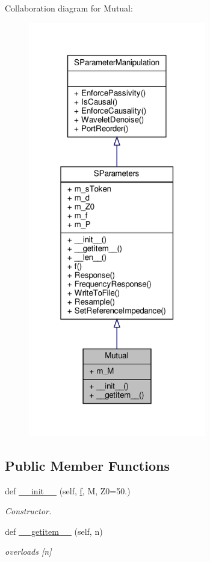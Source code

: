 Collaboration diagram for Mutual\+:\nopagebreak
\begin{figure}[H]
\begin{center}
\leavevmode
\includegraphics[width=220pt]{classSignalIntegrity_1_1SParameters_1_1Devices_1_1Mutual_1_1Mutual__coll__graph}
\end{center}
\end{figure}
\subsection*{Public Member Functions}
\begin{DoxyCompactItemize}
\item 
def \hyperlink{classSignalIntegrity_1_1SParameters_1_1Devices_1_1Mutual_1_1Mutual_a0b54ec80fdef206b3b2bf17d77b083ee}{\+\_\+\+\_\+init\+\_\+\+\_\+} (self, \hyperlink{classSignalIntegrity_1_1SParameters_1_1SParameters_1_1SParameters_a32e7a34d6837fe949b413c852a0447f8}{f}, M, Z0=50.)
\begin{DoxyCompactList}\small\item\em Constructor. \end{DoxyCompactList}\item 
def \hyperlink{classSignalIntegrity_1_1SParameters_1_1Devices_1_1Mutual_1_1Mutual_ab7a6da5139e0878b590d68292aaa70f2}{\+\_\+\+\_\+getitem\+\_\+\+\_\+} (self, n)
\begin{DoxyCompactList}\small\item\em overloads \mbox{[}n\mbox{]} \end{DoxyCompactList}\end{DoxyCompactItemize}


